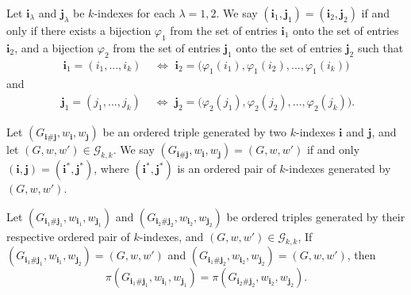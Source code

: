 \begin{definition}
  \notready
  \label{def:index_pair_rel}
  \uses{} %
  Let $\mathbf{i}_\lambda$ and $\mathbf{j}_\lambda$ be $k$-indexes for each $\lambda=1,2$. We say $(\mathbf{i}_1,\mathbf{j}_1) = (\mathbf{i}_2,\mathbf{j}_2)$ if and only if there exists a bijection $\varphi_1$ from the set of entries $\mathbf{i}_1$ onto the set of entries $\mathbf{i}_2$,
  and a bijection $\varphi_2$ from the set of entries $\mathbf{j}_1$ onto the set of entries $\mathbf{j}_2$ such that
  \begin{equation}
  \begin{split}
    \mathbf{i}_1 = (i_1,...,i_k) & \,\, \Longleftrightarrow \,\, \mathbf{i}_2 = \bigl( \varphi_1(i_1),\varphi_1(i_2),...,\varphi_1(i_k) \bigl)
  \end{split}
  \end{equation}
  and
  \begin{equation}
  \begin{split}
    \phantom{.}\mathbf{j}_1 = (j_1,...,j_k) & \,\, \Longleftrightarrow \,\, \mathbf{j}_2 = \bigl( \varphi_2(j_1),\varphi_2(j_2),...,\varphi_2(j_k) \bigl).
  \end{split}
  \end{equation}
\end{definition}


\begin{definition}
  \notready
  \label{def:graph_walk_triple_rel}
  Let $(G_{\mathbf{i} \# \mathbf{j}},w_\mathbf{i},w_\mathbf{j})$ be an ordered triple generated by two $k$-indexes $\mathbf{i}$ and $\mathbf{j}$, and let $(G,w,w') \in \mathcal{G}_{k,k}$.
  We say $(G_{\mathbf{i} \# \mathbf{j}},w_\mathbf{i},w_\mathbf{j}) = (G,w,w')$ if and only $(\mathbf{i},\mathbf{j}) = (\mathbf{i}^*,\mathbf{j}^*)$,
  where $(\mathbf{i}^*,\mathbf{j}^*)$ is an ordered pair of $k$-indexes generated by $(G,w,w')$.
\end{definition}


\begin{lemma}
  \notready
  \label{lem:common_val_prod_eq_of_graph_walk_triple_rel}
  Let $(G_{\mathbf{i}_1 \# \mathbf{j}_1},w_{\mathbf{i}_1},w_{\mathbf{j}_1})$ and $(G_{\mathbf{i}_2 \# \mathbf{j}_2},w_{\mathbf{i}_2},w_{\mathbf{j}_2})$ be ordered triples generated by their respective ordered pair of $k$-indexes, and $(G,w,w') \in \mathcal{G}_{k,k}$,
  If $(G_{\mathbf{i}_1 \# \mathbf{j}_1},w_{\mathbf{i}_1},w_{\mathbf{j}_2}) = (G,w,w')$ and $(G_{\mathbf{i}_1 \# \mathbf{j}_2},w_{\mathbf{i}_2},w_{\mathbf{j}_2}) = (G,w,w')$, then
  \[
  \pi(G_{\mathbf{i}_1\#\mathbf{j}_1},w_{\mathbf{i}_1},w_{\mathbf{j}_1}) = \pi(G_{\mathbf{i}_2 \# \mathbf{j}_2},w_{\mathbf{i}_2},w_{\mathbf{j}_2}).
  \]
\end{lemma}

